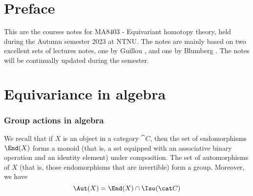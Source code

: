 \documentclass{willowtreebook}
\begin{document}
\chapter{Preface}
This are the courses notes for MA8403 - Equivariant homotopy theory, held during the Autumn semester 2023 at NTNU. The notes are mainly based on two excellent sets of lectures notes, one by Guillou \cite{guillou}, and one by Blumberg \cite{blumberg}. The notes will be continually updated during the semester. 
\afterpreface
\chapter{Equivariance in algebra}
\subsection{Group actions in algebra}
We recall that if $X$ is an object in a category $\cat C$, then the set of endomorphisms $\End(X)$ forms a monoid (that is, a set equipped with an associative binary operation and an identity element) under composition. The set of automorphisms of $X$ (that is, those endomorphisms that are invertible) form a group. Moreover, we have
\[
\Aut(X) = \End(X) \cap \Iso(\cat C)
\]
\end{document}
